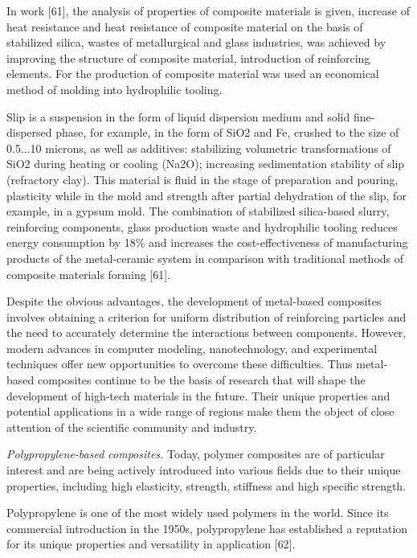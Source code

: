In work {[}61{]}, the analysis of properties of composite materials is
given, increase of heat resistance and heat resistance of composite
material on the basis of stabilized silica, wastes of metallurgical and
glass industries, was achieved by improving the structure of composite
material, introduction of reinforcing elements. For the production of
composite material was used an economical method of molding into
hydrophilic tooling.

Slip is a suspension in the form of liquid dispersion medium and solid
fine-dispersed phase, for example, in the form of SiO2 and Fe, crushed
to the size of 0.5...10 microns, as well as additives: stabilizing
volumetric transformations of SiO2 during heating or cooling (Na2O);
increasing sedimentation stability of slip (refractory clay). This
material is fluid in the stage of preparation and pouring, plasticity
while in the mold and strength after partial dehydration of the slip,
for example, in a gypsum mold. The combination of stabilized
silica-based slurry, reinforcing components, glass production waste and
hydrophilic tooling reduces energy consumption by 18\% and increases the
cost-effectiveness of manufacturing products of the metal-ceramic system
in comparison with traditional methods of composite materials forming
{[}61{]}.

Despite the obvious advantages, the development of metal-based
composites involves obtaining a criterion for uniform distribution of
reinforcing particles and the need to accurately determine the
interactions between components. However, modern advances in computer
modeling, nanotechnology, and experimental techniques offer new
opportunities to overcome these difficulties. Thus metal-based
composites continue to be the basis of research that will shape the
development of high-tech materials in the future. Their unique
properties and potential applications in a wide range of regions make
them the object of close attention of the scientific community and
industry.

\emph{Polypropylene-based composites.} Today, polymer composites are of
particular interest and are being actively introduced into various
fields due to their unique properties, including high elasticity,
strength, stiffness and high specific strength.

Polypropylene is one of the most widely used polymers in the world.
Since its commercial introduction in the 1950s, polypropylene has
established a reputation for its unique properties and versatility in
application {[}62{]}.

